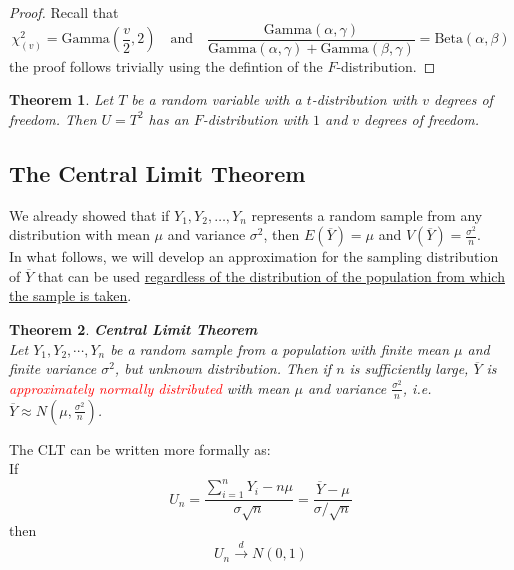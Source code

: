 \documentclass[a4paper,12pt]{article}
\theoremstyle{nonitalic}
\newtheorem{theorem}{Theorem}[subsection]
\begin{document}
    \begin{proof}
        Recall that
        \[
            \chi^2_{(v)} = \text{Gamma}\left(\frac{v}{2}, 2\right) \quad \text{and} \quad \frac{\text{Gamma}(\alpha, \gamma)}{\text{Gamma}(\alpha, \gamma) + \text{Gamma}(\beta, \gamma)} = \text{Beta}(\alpha, \beta)
        \]
        the proof follows trivially using the defintion of the $F$-distribution.
    \end{proof}

    \begin{theorem}
        Let $T$ be a random variable with a $t$-distribution with $v$ degrees of freedom. Then $U = T^2$ has an $F$-distribution with $1$ and $v$ degrees of freedom.
    \end{theorem}

    \newpage

    \subsection{The Central Limit Theorem}

    We already showed that if \(Y_1, Y_2, \ldots, Y_n\) represents a random sample from any distribution with mean \(\mu\) and variance \(\sigma^2\), then \(E(\overline{Y}) = \mu\) and \(V(\overline{Y}) = \frac{\sigma^2}{n}\).\\
    In what follows, we will develop an approximation for the sampling distribution of \(\overline{Y}\) that can be used \uline{regardless of the distribution of the population from which the sample is taken}.

    \bigskip

    \begin{theorem} \textbf{Central Limit Theorem}\\
        Let \(Y_1, Y_2, \cdots, Y_n\) be a random sample from a population with finite mean \(\mu\) and finite variance \(\sigma^2\), but unknown distribution. Then if \(n\) is sufficiently large, \(\overline{Y}\) is \textcolor{red}{approximately normally distributed} with mean \(\mu\) and variance \(\frac{\sigma^2}{n}\), i.e. $\overline{Y} \approx N(\mu, \frac{\sigma^2}{n})$.
    \end{theorem}

    \bigskip

    The CLT can be written more formally as:\\
    If
    \[
        U_n = \frac{\sum_{i=1}^n Y_i - n\mu}{\sigma \sqrt{n}} = \frac{\overline{Y} - \mu}{\sigma / \sqrt{n}}
    \]
    then
    \[
        U_n \overset{d}{\to} N(0, 1)
    \]
\end{document}
